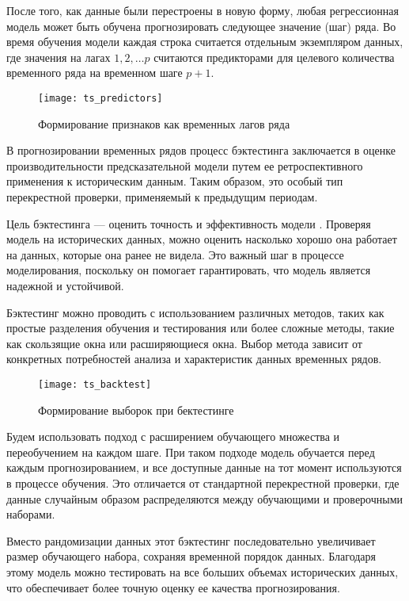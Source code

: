 После того, как данные были перестроены в новую форму, любая регрессионная модель может быть обучена прогнозировать 
следующее значение (шаг) ряда. Во время обучения модели каждая строка считается отдельным экземпляром данных, 
где значения на лагах $1, 2, \dots p$ считаются предикторами для целевого количества временного ряда на временном шаге $p+1$.

\begin{figure}[H]
	\texttt{[image: ts\_predictors]}
	\caption{Формирование признаков как временных лагов ряда}
\end{figure}

В прогнозировании временных рядов процесс бэктестинга заключается в оценке производительности предсказательной модели путем ее 
ретроспективного применения к историческим данным. Таким образом, это особый тип перекрестной проверки, применяемый к предыдущим
периодам.

Цель бэктестинга --- оценить точность и эффективность модели . 
Проверяя модель на исторических данных, можно оценить насколько хорошо она работает на данных, которые она ранее не видела. 
Это важный шаг в процессе моделирования, поскольку он помогает гарантировать, что модель является надежной и устойчивой.

Бэктестинг можно проводить с использованием различных методов, таких как простые разделения обучения и тестирования или более 
сложные методы, такие как скользящие окна или расширяющиеся окна. Выбор метода зависит от конкретных потребностей анализа и 
характеристик данных временных рядов.

\begin{figure}[H]
	\texttt{[image: ts\_backtest]}
	\caption{Формирование выборок при бектестинге}
\end{figure}

Будем использовать подход с расширением обучающего множества и переобучением на каждом шаге.
При таком подходе модель обучается перед каждым прогнозированием, и все доступные данные на тот момент используются в процессе обучения. 
Это отличается от стандартной перекрестной проверки, где данные случайным образом распределяются между обучающими и проверочными наборами.

Вместо рандомизации данных этот бэктестинг последовательно увеличивает размер обучающего набора, сохраняя временной порядок данных. 
Благодаря этому модель можно тестировать на все больших объемах исторических данных, что обеспечивает более точную оценку ее 
качества прогнозирования.

